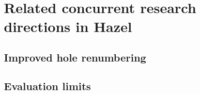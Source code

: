 \section{Related concurrent research directions in Hazel}
\label{app:contributions}

\subsection{Improved hole renumbering}
\label{sec:other_hole_numbering}


\subsection{Evaluation limits}
\label{sec:gas}



